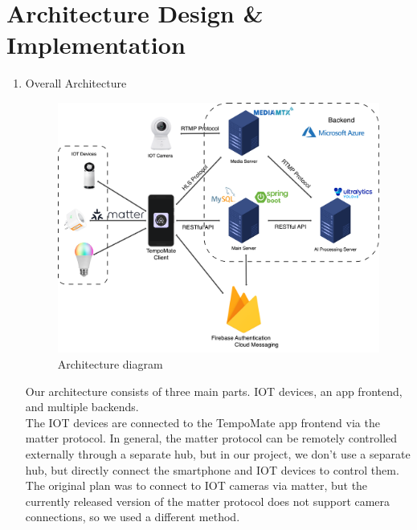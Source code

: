 \newcommand{\addImage}[2]{
  \begin{figure}[!htb]
    \begin{center}
      \texttt{[image: \#1]}
      \caption{#2} %
      \renewcommand{\thefigure}{\thesubsection.\arabic{figure}}
    \end{center}
  \end{figure}
}

\newpage
\section{\Large{Architecture Design \& Implementation}}

\begin{enumerate}[label=\arabic*]
  \item {\large{Overall Architecture}}\\
    \begin{figure}[!h]
        \begin{center}
            \includegraphics[width=14cm]{imgs/architecture.drawio.png}
            \caption{Architecture diagram} %
            \renewcommand{\thefigure}{\thesubsection.\arabic{figure}}
        \end{center}
    \end{figure}
    Our architecture consists of three main parts. IOT devices, an app frontend, and multiple backends.\\
    
    The IOT devices are connected to the TempoMate app frontend via the matter protocol. In general, the matter protocol can be remotely controlled externally through a separate hub, but in our project, we don't use a separate hub, but directly connect the smartphone and IOT devices to control them. The original plan was to connect to IOT cameras via matter, but the currently released version of the matter protocol does not support camera connections, so we used a different method.\\
     

\end{enumerate}

